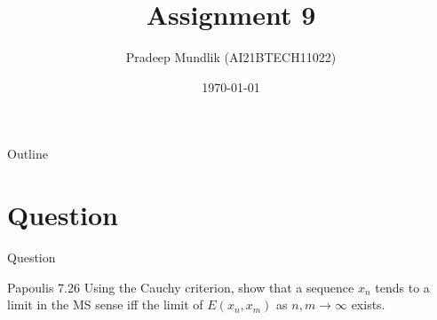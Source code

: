 \documentclass{beamer}
\title{Assignment 9}
\author{Pradeep Mundlik (AI21BTECH11022)}
\date{\today}
\begin{document}
\begin{frame}
    \titlepage 
\end{frame}



\begin{frame}{Outline}
    \tableofcontents
\end{frame}


\section{Question}
\begin{frame}{Question}
    \begin{block}{Papoulis 7.26}
        Using the Cauchy criterion, show that a sequence $x_n$ tends to a limit in the MS sense iff the limit of $E(x_n,x_m)$ as $n,m\rightarrow \infty$ exists.
    \end{block}
\end{frame}
\end{document}
